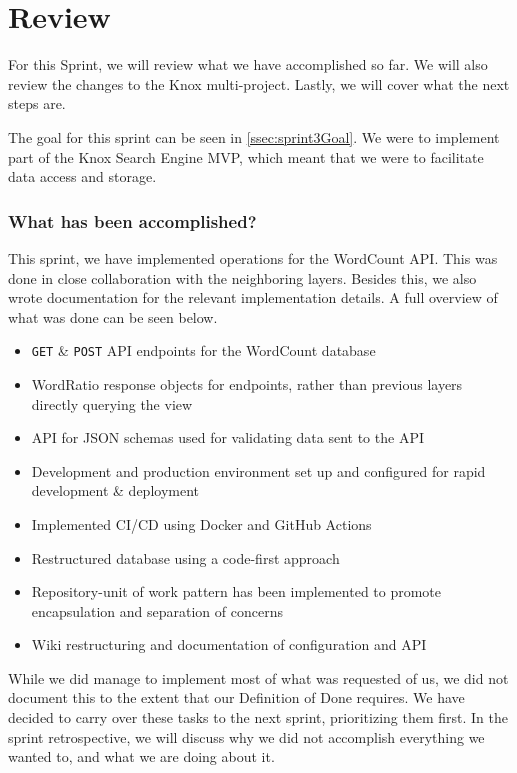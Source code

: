 \section{Review}

For this Sprint, we will review what we have accomplished so far. We will also review the changes to the Knox multi-project. Lastly, we will cover what the next steps are.

The goal for this sprint can be seen in \ref{ssec:sprint3Goal}. We were to implement part of the Knox Search Engine MVP, which meant that we were to facilitate data access and storage.


\subsubsection{What has been accomplished?}
This sprint, we have implemented operations for the WordCount API. This was done in close collaboration with the neighboring layers. Besides this, we also wrote documentation for the relevant implementation details. A full overview of what was done can be seen below.

\begin{itemize}
    \item \texttt{GET} \& \texttt{POST} API endpoints for the WordCount database
    \item WordRatio response objects for endpoints, rather than previous layers directly querying the view
    \item API for JSON schemas used for validating data sent to the API
    \item Development and production environment set up and configured for rapid development \& deployment
    \item Implemented CI/CD using Docker and GitHub Actions
    \item Restructured database using a code-first approach
    \item Repository-unit of work pattern has been implemented to promote encapsulation and separation of concerns
    \item Wiki restructuring and documentation of configuration and API
\end{itemize}

While we did manage to implement most of what was requested of us, we did not document this to the extent that our Definition of Done requires. We have decided to carry over these tasks to the next sprint, prioritizing them first. In the sprint retrospective, we will discuss why we did not accomplish everything we wanted to, and what we are doing about it.

